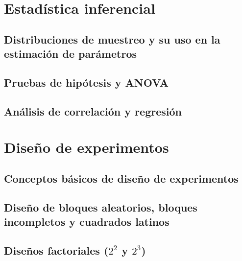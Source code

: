 \documentclass{../summarie}
\begin{document}
\Portada
\Indice
\fancystyle
\onehalfspacing


\part{Estadística inferencial}

    \chapter{Distribuciones de muestreo y su uso en la estimación de parámetros}
    \chapter{Pruebas de hipótesis y ANOVA}
    \chapter{Análisis de correlación y regresión}
    
\part{Diseño de experimentos}

    \chapter{Conceptos básicos de diseño de experimentos}
    \chapter{Diseño de bloques aleatorios, bloques incompletos y cuadrados latinos}
    \chapter{Diseños factoriales ($2^{2}$ y $2^{3}$)}


\newpage


\end{document}
